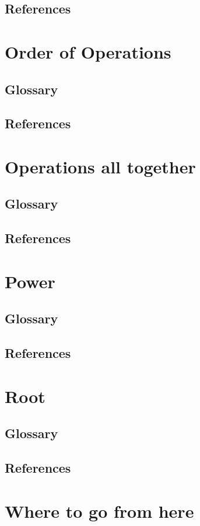 \documentclass[12pt]{book}
\begin{document}
\section{References}
\newpage


\chapter{Order of Operations}%
\section{Glossary}
\section{References}
\newpage

\chapter{Operations all together}%
\section{Glossary}
\section{References}
\newpage

\chapter{Power}%
\section{Glossary}
\section{References}
\newpage

\chapter{Root}%
\section{Glossary}
\section{References}
\newpage

\chapter{Where to go from here}
\newpage

\backmatter
\printindex
\end{document}
